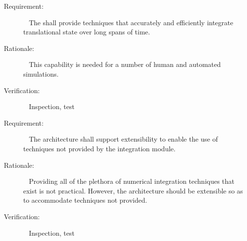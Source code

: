  \label{reqt:long_arc_integration} \begin{description} \item[Requirement:]\ \newline
 The \ModelDesc shall provide techniques that accurately and efficiently
 integrate translational state over long spans of time.

\item[Rationale:]\ \newline
 This capability is needed for a number of human and automated simulations.

\item[Verification:]\ \newline
 Inspection, test
\end{description}


\label{reqt:extensibility}
\begin{description}
\item[Requirement:]\ \newline
 The \ModelDesc architecture shall support extensibility to enable the use of
 techniques not provided by the \erseven integration module.

\item[Rationale:]\ \newline
 Providing all of the plethora of numerical integration techniques
 that exist is not practical. However, the architecture should be
 extensible so as to accommodate techniques not provided.

\item[Verification:]\ \newline
 Inspection, test
\end{description}


